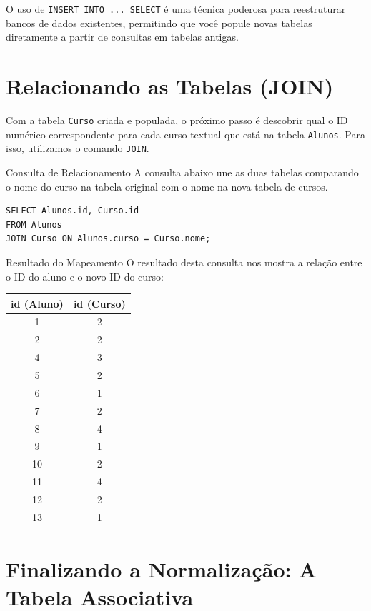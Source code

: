 \documentclass[12pt]{article}
\begin{document}
\begin{dica}
O uso de \texttt{INSERT INTO ... SELECT} é uma técnica poderosa para reestruturar bancos de dados existentes, permitindo que você popule novas tabelas diretamente a partir de consultas em tabelas antigas.
\end{dica}
\section{Relacionando as Tabelas (JOIN)}

Com a tabela \texttt{Curso} criada e populada, o próximo passo é descobrir qual o ID numérico correspondente para cada curso textual que está na tabela \texttt{Alunos}. Para isso, utilizamos o comando \texttt{JOIN}.

\begin{block}{Consulta de Relacionamento}
A consulta abaixo une as duas tabelas comparando o nome do curso na tabela original com o nome na nova tabela de cursos.

\begin{lstlisting}
SELECT Alunos.id, Curso.id
FROM Alunos
JOIN Curso ON Alunos.curso = Curso.nome;
\end{lstlisting}
\end{block}

\begin{block}{Resultado do Mapeamento}
O resultado desta consulta nos mostra a relação entre o ID do aluno e o novo ID do curso:

\begin{center}
{\tiny
\begin{longtable}{cc}
\toprule
\textbf{id (Aluno)} & \textbf{id (Curso)} \\
\midrule
1 & 2 \\
2 & 2 \\
4 & 3 \\
5 & 2 \\
6 & 1 \\
7 & 2 \\
8 & 4 \\
9 & 1 \\
10 & 2 \\
11 & 4 \\
12 & 2 \\
13 & 1 \\
\bottomrule
\end{longtable}
}
\end{center}
\end{block}

\section{Finalizando a Normalização: A Tabela Associativa}
\end{document}
